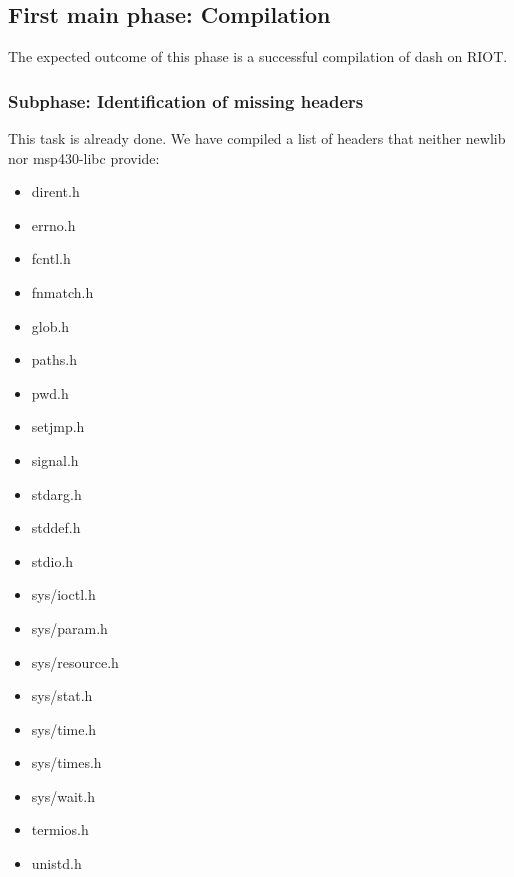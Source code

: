 \documentclass[11pt,
  a4paper,
  BCOR=7mm
]{scrartcl}
\begin{document}
\subsection*{First main phase: Compilation}
\label{sub:compilation}
The expected outcome of this phase is a successful compilation of dash
on RIOT.

\subsubsection*{Subphase: Identification of missing headers}
\label{ssub:headers_identification}
This task is already done. We have compiled a list of headers that
neither newlib nor msp430-libc provide:

\begin{itemize}
    \item dirent.h\footnotemark[1]
    \item errno.h\footnotemark[1]
    \item fcntl.h\footnotemark[1]
    \item fnmatch.h\footnotemark[1]
    \item glob.h\footnotemark[1]
    \item paths.h\footnotemark[1]
    \item pwd.h\footnotemark[1]
    \item setjmp.h\footnotemark[2]
    \item signal.h\footnotemark[2]
    \item stdarg.h
    \item stddef.h
    \item stdio.h\footnotemark[3]
    \item sys/ioctl.h\footnotemark[4]
    \item sys/param.h\footnotemark[1]
    \item sys/resource.h\footnotemark[1]
    \item sys/stat.h\footnotemark[1]
    \item sys/time.h\footnotemark[1]
    \item sys/times.h\footnotemark[1]
    \item sys/wait.h\footnotemark[1]
    \item termios.h\footnotemark[1]
    \item unistd.h\footnotemark[1]
\end{itemize}

\end{document}
